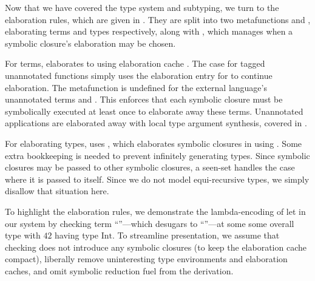 Now that we have covered the type system and subtyping, we turn to the elaboration rules,
which are given in .
They are split into two metafunctions \ltielimClossymbol and \ltielimClosTsymbol,
elaborating terms and types respectively, along with
\ltiupdateClosureCacheSinglesymbol, which manages when a symbolic closure's elaboration may
be chosen.

For terms, \ltielimClos{\ltiClosureCache{}}{\ltiE{}}{\ltiEp{}}
elaborates \ltiE{} to \ltiEp{} using elaboration cache \ltiClosureCache{}.
The case for tagged unannotated functions 
{\ltiufunelab{\ltiufunelabentry{\ltiClosureID{}}}
                                  {\ltivar{}}
                                  {\ltiE{}}}
simply uses the elaboration entry for \ltiClosureID{} to continue elaboration.
The metafunction is undefined for the external language's unannotated terms
\ltiufun{\ltivar{}}{\ltiE{}} and \ltiapp{\ltiF{}}{\ltiE{}}.
This enforces that each symbolic closure must be symbolically executed at least once
to elaborate away these terms.
Unannotated applications \ltiapp{\ltiF{}}{\ltiE{}}
are elaborated away with local type argument synthesis, covered in
.

For elaborating types, \ltielimClossymbol
uses \ltielimClosT{\ova{\ltiClosureID{}}}{\ltiClosureCache{}}{\ltiT{}}{\ltiTp{}}, which
elaborates symbolic closures in \ltiT{} using \ltiClosureCache{}.
Some extra bookkeeping is needed to prevent infinitely generating
types. Since symbolic closures may be passed to other symbolic closures,
a seen-set \ova{\ltiClosureID{}} handles the case where it is passed to itself.
Since we do not model equi-recursive types, we simply disallow that situation here.

To highlight the elaboration rules,
we demonstrate the lambda-encoding of let in our system by
checking term ``''---which desugars to
``{}''---at some
some overall type \ltiS{}
with $\text{42}$ having type $\text{Int}$.
To streamline presentation, we assume that checking \ltiF{}
does not introduce any symbolic closures
(to keep the elaboration cache compact), liberally
remove uninteresting type environments and elaboration caches,
and omit symbolic reduction fuel from the derivation.

